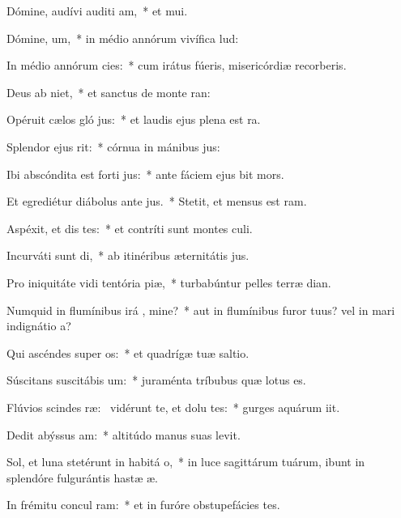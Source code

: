 \item Dómine, audívi auditi am,~* et mui.
\item Dómine,  um,~* in médio annórum vivífica lud:
\item In médio annórum  cies:~* cum irátus fúeris, misericórdiæ recorberis.
\item Deus ab  niet,~* et sanctus de monte ran:
\item Opéruit cælos gló jus:~* et laudis ejus plena est ra.
\item Splendor ejus   rit:~* córnua in mánibus jus:
\item Ibi abscóndita est forti jus:~* ante fáciem ejus bit mors.
\item Et egrediétur diábolus ante  jus.~* Stetit, et mensus est ram.
\item Aspéxit, et dis tes:~* et contríti sunt montes culi.
\item Incurváti sunt  di,~* ab itinéribus æternitátis jus.
\item Pro iniquitáte vidi tentória piæ,~* turbabúntur pelles terræ dian.
\item Numquid in flumínibus irá , mine?~* aut in flumínibus furor tuus? vel in mari indignátio a?
\item Qui ascéndes super  os:~* et quadrígæ tuæ saltio.
\item Súscitans suscitábis  um:~* juraménta tríbubus quæ lotus es.
\item Flúvios scindes ræ:~\pscross{} vidérunt te, et dolu tes:~* gurges aquárum iit.
\item Dedit abýssus  am:~* altitúdo manus suas levit.
\item Sol, et luna stetérunt in habitá o,~* in luce sagittárum tuárum, ibunt in splendóre fulgurántis hastæ æ.
\item In frémitu concul ram:~* et in furóre obstupefácies tes.

